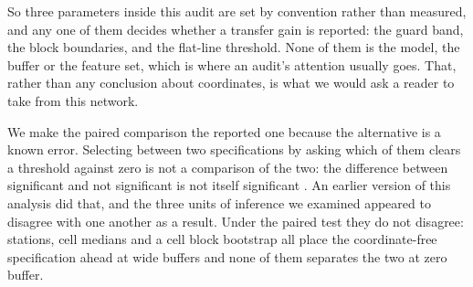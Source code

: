 \documentclass[review,times,authoryear]{elsarticle}
\begin{document}
So three parameters inside this audit are set by convention rather than measured, and any one of them decides whether a transfer gain is reported: the guard band, the block boundaries, and the flat-line threshold. None of them is the model, the buffer or the feature set, which is where an audit's attention usually goes. That, rather than any conclusion about coordinates, is what we would ask a reader to take from this network.

We make the paired comparison the reported one because the alternative is a known error. Selecting between two specifications by asking which of them clears a threshold against zero is not a comparison of the two: the difference between significant and not significant is not itself significant \citep{gelman2006}. An earlier version of this analysis did that, and the three units of inference we examined appeared to disagree with one another as a result. Under the paired test they do not disagree: stations, cell medians and a cell block bootstrap all place the coordinate-free specification ahead at wide buffers and none of them separates the two at zero buffer.
\end{document}
